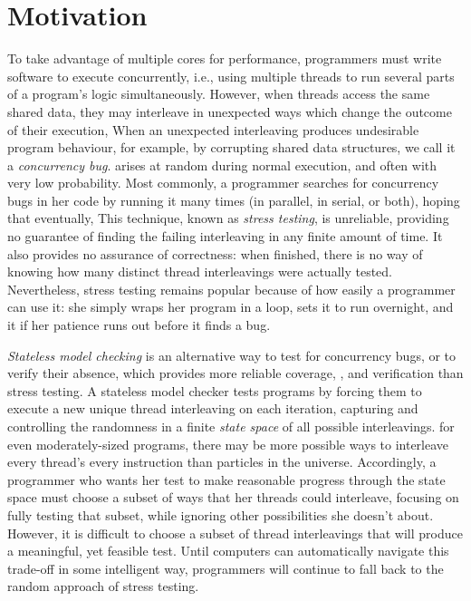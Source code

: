 \section{Motivation}

To take advantage of multiple cores for performance, programmers must write software to execute concurrently,
i.e.,
using multiple threads to run several parts of a program's logic simultaneously.
However, when threads access the same shared data,
they may interleave in unexpected ways which change the outcome of their execution,
When an unexpected interleaving produces undesirable program behaviour,
for example, by corrupting shared data structures,
we call it a {\em concurrency bug}.
arises at random during normal execution,
and often with very low probability.
%
Most commonly, a programmer searches for concurrency bugs in her code by running it many times (in parallel, in serial, or both),
hoping that eventually,
This technique, known as {\em stress testing}, is unreliable,
providing no guarantee of finding the failing interleaving in any finite amount of time.
It also provides no assurance of correctness:
when finished, there is no way of knowing how many distinct thread interleavings were actually tested.
Nevertheless, stress testing remains popular because of how easily a programmer can use it:
she simply wraps her program in a loop, sets it to run overnight, and  it if her patience runs out before it finds a bug.

{\em Stateless model checking} \cite{verisoft} is an alternative way to test for concurrency bugs,
or to verify their absence,
which provides more reliable coverage, , and verification than stress testing.
A stateless model checker tests programs by forcing them to execute a new unique thread interleaving on each iteration,
capturing and controlling the randomness in a finite {\em state space} of all possible interleavings.
%
for even moderately-sized programs, there may be more possible ways to interleave every thread's every instruction
than particles in the universe.
Accordingly, a programmer who wants her test to make reasonable progress through the state space must choose a subset of ways that her threads could interleave,
focusing on fully testing that subset, while ignoring other possibilities she doesn't  about.
However, it is difficult to choose a subset of thread interleavings that will produce a meaningful, yet feasible test.
Until computers can automatically navigate this trade-off in some intelligent way,
programmers will continue to fall back to the random approach of stress testing.


